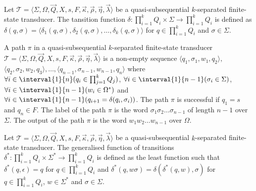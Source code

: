 \begin{definition}
	Let $\mathcal{T} = \langle \Sigma, \Omega, \vec{Q}, X, s, F, \vec{\kappa},
	\vec{\rho}, \vec{\eta}, \vec{\lambda} \rangle$ be a quasi-subsequential
	$k$-separated finite-state transducer. The tansition function $\delta :
	\prod_{i=1}^k{Q_i} \times \Sigma \rightarrow \prod_{i=1}^k{Q_i}$ is defined
	as $\delta(q, \sigma) = \langle \delta_1(q, \sigma), \delta_2(q, \sigma),
	\ldots, \delta_k(q, \sigma) \rangle$ for $q \in \prod_{i=1}^k{Q_i}$ and
	$\sigma \in \Sigma$.
\end{definition}

\begin{definition}
	A path $\pi$ in a quasi-subsequential $k$-separated finite-state
	transducer $\mathcal{T} = \langle \Sigma, \Omega, \vec{Q}, X, s, F,
	\vec{\kappa}, \vec{\rho}, \vec{\eta}, \vec{\lambda} \rangle$ is a non-empty
	sequence $\langle q_1, \sigma_1, w_1, q_2 \rangle,$\\
	$\langle q_2, \sigma_2, w_2, q_3 \rangle, \ldots, \langle q_{n-1},
	\sigma_{n-1}, w_{n-1}, q_n \rangle$ where $\forall i \in
	\interval{1}{n}(q_i \in \prod_{j=1}^k{Q_j})$, $\forall i \in
	\interval{1}{n-1} (\sigma_i \in \Sigma)$, $\forall i \in
	\interval{1}{n-1} (w_i \in \Omega^*)$ and $\forall i \in
	\interval{1}{n-1} (q_{i+1} = \delta(q_i, \sigma_i))$. The path $\pi$ is
	successful if $q_1 = s$ and $q_n \in F$. The label of the path $\pi$ is the
	word $\sigma_1\sigma_2\ldots\sigma_{n-1}$ of length $n-1$ over $\Sigma$.
	The output of the path $\pi$ is the word $w_1 w_2 \ldots w_{n-1}$ over
	$\Omega$.
\end{definition}

\begin{definition}
	Let $\mathcal{T} = \langle \Sigma, \Omega, \vec{Q}, X, s, F,
	\vec{\kappa}, \vec{\rho}, \vec{\eta}, \vec{\lambda} \rangle$
	be a quasi-subsequential $k$-separated finite-state transducer. The
	generalised function of transitions $\delta^* : \prod_{i=1}^k{Q_i}
	\times \Sigma^* \rightarrow \prod_{i=1}^k{Q_i}$ is defined as the least
	function such that $\delta^*(q, \epsilon) = q$ for $q \in
	\prod_{i=1}^k{Q_i}$ and $\delta^*(q, w\sigma) = \delta(\delta^*(q, w),
	\sigma)$ for $q \in \prod_{i=1}^k{Q_i}$, $w \in \Sigma^*$ and $\sigma \in
	\Sigma$.
\end{definition}
